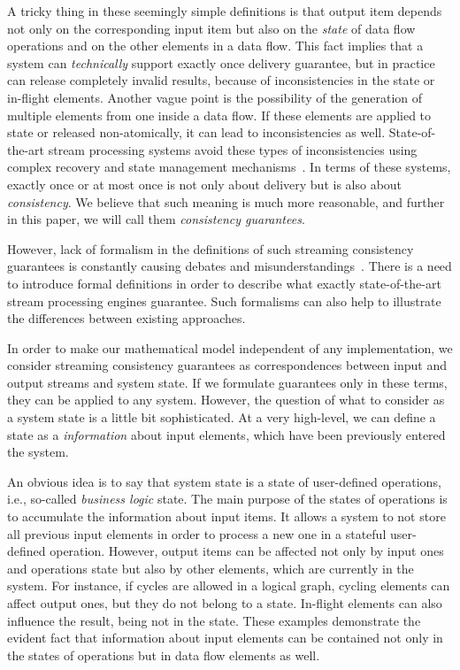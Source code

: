 \documentclass[sigconf]{acmart}
\theoremstyle{definition}
\begin{document}
A tricky thing in these seemingly simple definitions is that output item depends not only on the corresponding input item but also on the {\em state} of data flow operations and on the other elements in a data flow. This fact implies that a system can {\em technically} support exactly once delivery guarantee, but in practice can release completely invalid results, because of inconsistencies in the state or in-flight elements. Another vague point is the possibility of the generation of multiple elements from one inside a data flow. If these elements are applied to state or released non-atomically, it can lead to inconsistencies as well. State-of-the-art stream processing systems avoid these types of inconsistencies using complex recovery and state management mechanisms~\cite{Carbone:2017:SMA:3137765.3137777}. In terms of these systems, exactly once or at most once is not only about delivery but is also about {\em consistency}. We believe that such meaning is much more reasonable, and further in this paper, we will call them {\em consistency guarantees}.   

However, lack of formalism in the definitions of such streaming consistency guarantees is constantly causing debates and misunderstandings~\cite{JerryPengStreamIO, PaperTrail}. There is a need to introduce formal definitions in order to describe what exactly state-of-the-art stream processing engines guarantee. Such formalisms can also help to illustrate the differences between existing approaches.

In order to make our mathematical model independent of any implementation, we consider streaming consistency guarantees as correspondences between input and output streams and system state. If we formulate guarantees only in these terms, they can be applied to any system. However, the question of what to consider as a system state is a little bit sophisticated. At a very high-level, we can define a state as a {\em information} about input elements, which have been previously entered the system.  

An obvious idea is to say that system state is a state of user-defined operations, i.e., so-called {\em business logic} state. The main purpose of the states of operations is to accumulate the information about input items. It allows a system to not store all previous input elements in order to process a new one in a stateful user-defined operation. However, output items can be affected not only by input ones and operations state but also by other elements, which are currently in the system. For instance, if cycles are allowed in a logical graph, cycling elements can affect output ones, but they do not belong to a state. In-flight elements can also influence the result, being not in the state. These examples demonstrate the evident fact that information about input elements can be contained not only in the states of operations but in data flow elements as well.
\end{document}
